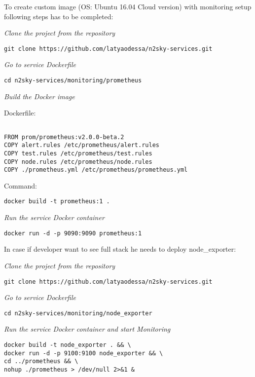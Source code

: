 To create custom image (OS: Ubuntu 16.04 Cloud version) with monitoring setup following steps has to be completed:

\emph{Clone the project from the repository}
 \begin{lstlisting}
git clone https://github.com/latyaodessa/n2sky-services.git 
\end{lstlisting}


\emph{Go to service Dockerfile}
 \begin{lstlisting}
cd n2sky-services/monitoring/prometheus
\end{lstlisting}

\emph{Build the Docker image}

Dockerfile:
 \begin{lstlisting}

FROM prom/prometheus:v2.0.0-beta.2
COPY alert.rules /etc/prometheus/alert.rules
COPY test.rules /etc/prometheus/test.rules
COPY node.rules /etc/prometheus/node.rules
COPY ./prometheus.yml /etc/prometheus/prometheus.yml

\end{lstlisting}

Command: 

 \begin{lstlisting}
docker build -t prometheus:1 .
\end{lstlisting}


\emph{Run the service Docker container}
 \begin{lstlisting}
docker run -d -p 9090:9090 prometheus:1
\end{lstlisting}


In case if developer want to see full stack he needs to deploy node\_exporter:

\emph{Clone the project from the repository}
 \begin{lstlisting}
git clone https://github.com/latyaodessa/n2sky-services.git 
\end{lstlisting}


\emph{Go to service Dockerfile}
 \begin{lstlisting}
cd n2sky-services/monitoring/node_exporter 
\end{lstlisting}

\emph{Run the service Docker container and start Monitoring}
 \begin{lstlisting}
docker build -t node_exporter . && \
docker run -d -p 9100:9100 node_exporter && \
cd ../prometheus && \
nohup ./prometheus > /dev/null 2>&1 &
\end{lstlisting}



